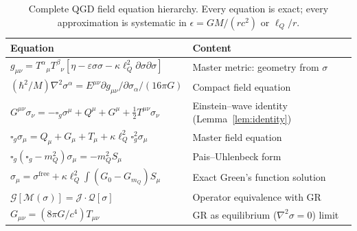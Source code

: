 \documentclass[11pt,a4paper]{article}
\theoremstyle{plain}
\theoremstyle{definition}
\theoremstyle{remark}
\newcommand{\lQ}{\ell_Q}
\newcommand{\mQ}{m_Q}
\newcommand{\boxg}{\square_g}
\newcommand{\half}{\tfrac{1}{2}}
\begin{document}
\begin{table}[h]
\centering
\renewcommand{\arraystretch}{1.5}
\begin{tabular}{@{}p{6.5cm}p{6.5cm}@{}}
\toprule
Equation & Content \\
\midrule
$g_{\mu\nu} = T^\alpha{}_\mu T^\beta{}_\nu[\eta - \varepsilon\sigma\sigma - \kappa\lQ^2\partial\sigma\partial\sigma]$ &
  Master metric: geometry from $\sigma$ \\
$(\hbar^2/M)\nabla^2\sigma^\alpha = E^{\mu\nu}\partial g_{\mu\nu}/\partial\sigma_\alpha / (16\pi G)$ &
  Compact field equation \\
$G^{\mu\nu}\sigma_\nu = -\boxg\sigma^\mu + Q^\mu + G^\mu + \half T^{\mu\nu}\sigma_\nu$ &
  Einstein--wave identity (Lemma~\ref{lem:identity}) \\
$\boxg\sigma_\mu = Q_\mu + G_\mu + T_\mu + \kappa\lQ^2\boxg^2\sigma_\mu$ &
  Master field equation \\
$\boxg(\boxg-\mQ^2)\sigma_\mu = -\mQ^2 S_\mu$ &
  Pais--Uhlenbeck form \\
$\sigma_\mu = \sigma^{\mathrm{free}} + \kappa\lQ^2\!\int(G_0-G_{\mQ})S_\mu$ &
  Exact Green's function solution \\
$\mathcal{G}[\mathcal{M}(\sigma)] = \mathcal{J}\cdot\mathcal{Q}[\sigma]$ &
  Operator equivalence with GR \\
$G_{\mu\nu} = (8\pi G/c^4)T_{\mu\nu}$ &
  GR as equilibrium ($\nabla^2\sigma = 0$) limit \\
\bottomrule
\end{tabular}
\caption{Complete QGD field equation hierarchy.  Every equation is exact;
every approximation is systematic in $\epsilon = GM/(rc^2)$ or $\lQ/r$.}
\end{table}
\end{document}

